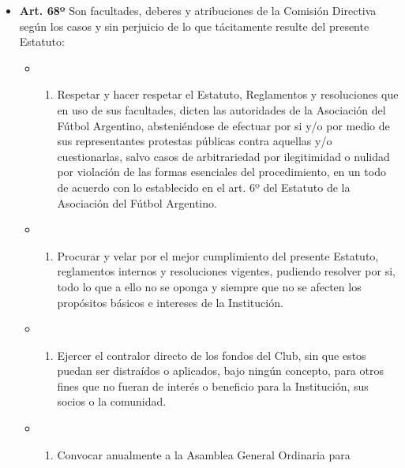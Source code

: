 \documentclass[]{book}
\providecommand{\tightlist}{%
  \setlength{\itemsep}{0pt}\setlength{\parskip}{0pt}}
\begin{document}
\begin{itemize}
\tightlist
\item
  \textbf{Art. 68º} Son facultades, deberes y atribuciones de la
  Comisión Directiva según los casos y sin perjuicio de lo que
  tácitamente resulte del presente Estatuto:

  \begin{itemize}
  \item
    \begin{enumerate}
    \def\labelenumi{\alph{enumi})}
    \tightlist
    \item
      Respetar y hacer respetar el Estatuto, Reglamentos y resoluciones
      que en uso de sus facultades, dicten las autoridades de la
      Asociación del Fútbol Argentino, absteniéndose de efectuar por si
      y/o por medio de sus representantes protestas públicas contra
      aquellas y/o cuestionarlas, salvo casos de arbitrariedad por
      ilegitimidad o nulidad por violación de las formas esenciales del
      procedimiento, en un todo de acuerdo con lo establecido en el art.
      6º del Estatuto de la Asociación del Fútbol Argentino.
    \end{enumerate}
  \item
    \begin{enumerate}
    \def\labelenumi{\alph{enumi})}
    \setcounter{enumi}{1}
    \tightlist
    \item
      Procurar y velar por el mejor cumplimiento del presente Estatuto,
      reglamentos internos y resoluciones vigentes, pudiendo resolver
      por si, todo lo que a ello no se oponga y siempre que no se
      afecten los propósitos básicos e intereses de la Institución.
    \end{enumerate}
  \item
    \begin{enumerate}
    \def\labelenumi{\alph{enumi})}
    \setcounter{enumi}{2}
    \tightlist
    \item
      Ejercer el contralor directo de los fondos del Club, sin que estos
      puedan ser distraídos o aplicados, bajo ningún concepto, para
      otros fines que no fueran de interés o beneficio para la
      Institución, sus socios o la comunidad.
    \end{enumerate}
  \item
    \begin{enumerate}
    \def\labelenumi{\alph{enumi})}
    \setcounter{enumi}{3}
    \tightlist
    \item
      Convocar anualmente a la Asamblea General Ordinaria para

\end{enumerate}
\end{itemize}
\end{itemize}
\end{document}
